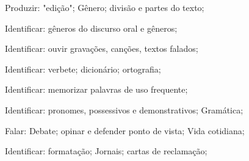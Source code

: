  Produzir: "edição"; Gênero; divisão e partes do texto;

 Identificar: gêneros do discurso oral e gêneros;

 Identificar: ouvir gravações, canções, textos falados;

 Identificar: verbete; dicionário; ortografia; 

 Identificar: memorizar palavras de uso frequente; 

 Identificar: pronomes, possessivos e demonstrativos; Gramática;

 Falar: Debate; opinar e defender ponto de vista; Vida cotidiana; 

 Identificar: formatação; Jornais; cartas de reclamação; 

